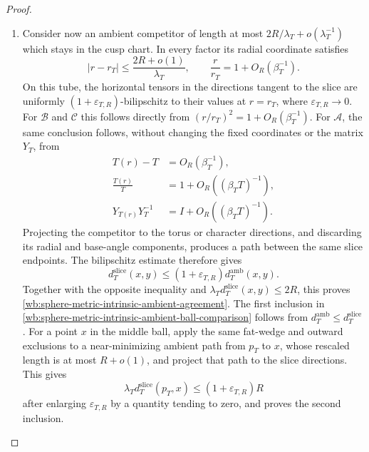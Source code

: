 \begin{proof}
\begin{enumerate}[label=\arabic*.,leftmargin=*]
\item Consider now an ambient competitor of length at most
\(2R/\lambda_T+o(\lambda_T^{-1})\) which stays in the cusp chart.  In every
factor its radial coordinate satisfies
\[
 |r-r_T|\leq \frac{2R+o(1)}{\lambda_T},
 \qquad
 \frac r{r_T}=1+O_R(\beta_T^{-1}).
\]
On this tube, the horizontal tensors in the directions tangent to the slice
are uniformly \((1+\varepsilon_{T,R})\)-bilipschitz to their values at
\(r=r_T\), where \(\varepsilon_{T,R}\to0\).  For
\(\mathcal B\) and \(\mathcal C\) this follows directly from
\((r/r_T)^2=1+O_R(\beta_T^{-1})\).  For \(\mathcal A\), the same conclusion
follows, without changing the fixed coordinates or the matrix \(Y_T\), from
\[
 \begin{aligned}
  T(r)-T&=O_R(\beta_T^{-1}),\\
  \frac{T(r)}T&=1+O_R((\beta_TT)^{-1}),\\
  Y_{T(r)}Y_T^{-1}&=I+O_R((\beta_TT)^{-1}).
 \end{aligned}
\]
Projecting the competitor to the torus or character directions, and
discarding its radial and base-angle components, produces a path between
the same slice endpoints.  The bilipschitz estimate therefore gives
\[
 d_T^{\mathrm{slice}}(x,y)
 \leq(1+\varepsilon_{T,R})d_T^{\mathrm{amb}}(x,y).
\]
Together with the opposite inequality and
\(\lambda_Td_T^{\mathrm{slice}}(x,y)\leq2R\), this proves
\eqref{wb:sphere-metric-intrinsic-ambient-agreement}.  The first inclusion in
\eqref{wb:sphere-metric-intrinsic-ambient-ball-comparison} follows from
\(d_T^{\mathrm{amb}}\leq d_T^{\mathrm{slice}}\).  For a point \(x\) in
the middle ball, apply the same fat-wedge and outward exclusions to a
near-minimizing ambient path from \(p_T\) to \(x\), whose rescaled length is
at most \(R+o(1)\), and project that path to the slice directions.  This
gives
\[
 \lambda_Td_T^{\mathrm{slice}}(p_T,x)
 \leq(1+\varepsilon_{T,R})R
\]
after enlarging \(\varepsilon_{T,R}\) by a quantity tending to zero, and
proves the second inclusion.


\end{enumerate}
\end{proof}
